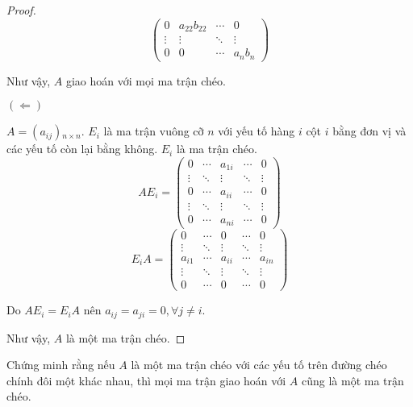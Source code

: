 \documentclass[class=linearalgebra,crop=false]{standalone}
\begin{document}
\begin{proof}
\[\begin{pmatrix}
            0            & a_{22}b_{22} & \cdots & 0          \\
            \vdots       & \vdots       & \ddots & \vdots     \\
            0            & 0            & \cdots & a_{n}b_{n}
        \end{pmatrix}
    \]
    \par Như vậy, $A$ giao hoán với mọi ma trận chéo.
    \par $(\Leftarrow)$
    \par $A = (a_{ij}){}_{n\times n}$. $E_{i}$ là ma trận vuông cỡ $n$ với yếu tố hàng $i$ cột $i$ bằng đơn vị và các yếu tố còn lại bằng không. $E_{i}$ là ma trận chéo.
    \[
        AE_{i} =
        \begin{pmatrix}
            0      & \cdots & a_{1i} & \cdots & 0      \\
            \vdots & \ddots & \vdots & \ddots & \vdots \\
            0      & \cdots & a_{ii} & \cdots & 0      \\
            \vdots & \ddots & \vdots & \ddots & \vdots \\
            0      & \cdots & a_{ni} & \cdots & 0
        \end{pmatrix}
    \]
    \[
        E_{i}A =
        \begin{pmatrix}
            0      & \cdots & 0      & \cdots & 0      \\
            \vdots & \ddots & \vdots & \ddots & \vdots \\
            a_{i1} & \cdots & a_{ii} & \cdots & a_{in} \\
            \vdots & \ddots & \vdots & \ddots & \vdots \\
            0      & \cdots & 0      & \cdots & 0
        \end{pmatrix}
    \]
    \par Do $AE_{i} = E_{i}A$ nên $a_{ij} = a_{ji} = 0, \forall j\ne i$.
    \par Như vậy, $A$ là một ma trận chéo.
\end{proof}

\begin{exercise}
    Chứng minh rằng nếu $A$ là một ma trận chéo với các yếu tố trên đường chéo chính đôi một khác nhau, thì mọi ma trận giao hoán với $A$ cũng là một ma trận chéo.
\end{exercise}
\end{document}
